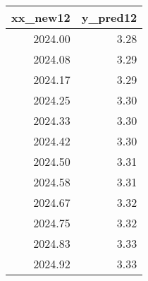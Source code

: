 \begin{table}[ht]
\centering
\begin{tabular}{rr}
  \hline
xx\_new12 & y\_pred12 \\ 
  \hline
2024.00 & 3.28 \\ 
  2024.08 & 3.29 \\ 
  2024.17 & 3.29 \\ 
  2024.25 & 3.30 \\ 
  2024.33 & 3.30 \\ 
  2024.42 & 3.30 \\ 
  2024.50 & 3.31 \\ 
  2024.58 & 3.31 \\ 
  2024.67 & 3.32 \\ 
  2024.75 & 3.32 \\ 
  2024.83 & 3.33 \\ 
  2024.92 & 3.33 \\ 
   \hline
\end{tabular}
\end{table}
